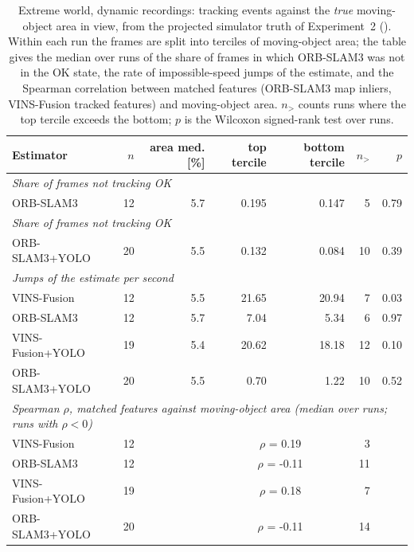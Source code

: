 \begin{table}[htbp]
\centering
\small
\caption[Extreme world: tracking events against the true moving-object area in view.]{Extreme world, dynamic recordings: tracking events against the \emph{true} moving-object area in view, from the projected simulator truth of Experiment~2 (). Within each run the frames are split into terciles of moving-object area; the table gives the median over runs of the share of frames in which ORB-SLAM3 was not in the OK state, the rate of impossible-speed jumps of the estimate, and the Spearman correlation between matched features (ORB-SLAM3 map inliers, VINS-Fusion tracked features) and moving-object area. $n_{>}$ counts runs where the top tercile exceeds the bottom; $p$ is the Wilcoxon signed-rank test over runs.}
\label{tab:insight-mechanism-extreme}
\begin{tabular}{lrrrrrr}
\toprule
Estimator & $n$ & area med. [\si{\percent}] & top tercile & bottom tercile & $n_{>}$ & $p$ \\
\midrule
\multicolumn{7}{l}{\emph{Share of frames not tracking OK}} \\
ORB-SLAM3 & 12 & 5.7 & 0.195 & 0.147 & 5 & 0.79 \\
\multicolumn{7}{l}{\emph{Share of frames not tracking OK}} \\
ORB-SLAM3+YOLO & 20 & 5.5 & 0.132 & 0.084 & 10 & 0.39 \\
\multicolumn{7}{l}{\emph{Jumps of the estimate per second}} \\
VINS-Fusion & 12 & 5.5 & 21.65 & 20.94 & 7 & 0.03 \\
ORB-SLAM3 & 12 & 5.7 & 7.04 & 5.34 & 6 & 0.97 \\
VINS-Fusion+YOLO & 19 & 5.4 & 20.62 & 18.18 & 12 & 0.10 \\
ORB-SLAM3+YOLO & 20 & 5.5 & 0.70 & 1.22 & 10 & 0.52 \\
\multicolumn{7}{l}{\emph{Spearman $\rho$, matched features against moving-object area (median over runs; runs with $\rho<0$)}} \\
VINS-Fusion & 12 & & \multicolumn{2}{c}{$\rho$ = 0.19} & 3 & \\
ORB-SLAM3 & 12 & & \multicolumn{2}{c}{$\rho$ = -0.11} & 11 & \\
VINS-Fusion+YOLO & 19 & & \multicolumn{2}{c}{$\rho$ = 0.18} & 7 & \\
ORB-SLAM3+YOLO & 20 & & \multicolumn{2}{c}{$\rho$ = -0.11} & 14 & \\
\bottomrule
\end{tabular}
\end{table}
